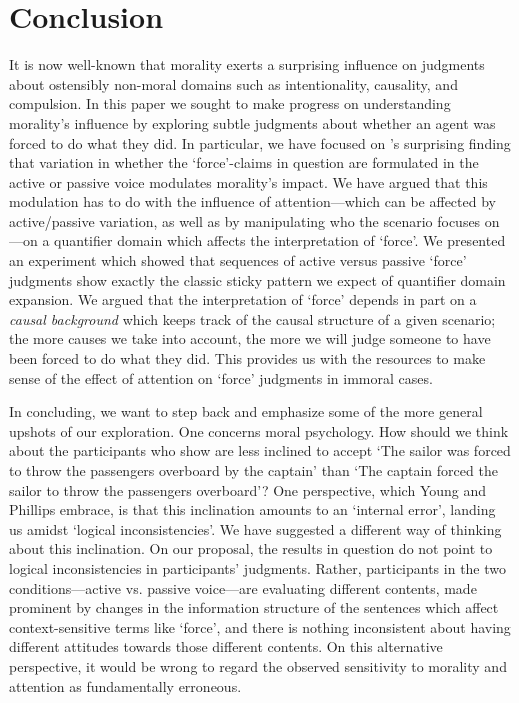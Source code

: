 \documentclass{salt}
\begin{document}
\section{Conclusion} \label{sec:conclusion}

It is now well-known that morality exerts a surprising influence on judgments about ostensibly non-moral domains such as intentionality, causality, and compulsion. In this paper we sought to make progress on understanding morality's influence by exploring subtle judgments about whether an agent was forced to do what they did. In particular, we have focused on \citet{young2011paradox}'s surprising finding that variation in whether the `force'-claims in question are formulated in the active or passive voice modulates morality's impact. We have argued that this modulation has to do with the influence of attention---which can be affected by active/passive variation, as well as by manipulating who the scenario focuses on---on a quantifier domain which affects the interpretation of `force'. We presented an experiment which showed that sequences of active versus passive `force' judgments show exactly the classic sticky pattern we expect of quantifier domain expansion. We  argued that the interpretation of `force' depends in part on a \emph{causal background} which keeps track of the causal structure of a given scenario; the more causes we take into account, the more we will judge someone to have been forced to do what they did. This provides us with the resources to make sense of the effect of  attention on `force' judgments in immoral cases.
	
In concluding, we want to step back and emphasize some of the more general upshots of our exploration. One concerns moral psychology. How should we think about the participants who show are less inclined to accept `The sailor was forced to throw the passengers overboard by the captain' than `The captain  forced the sailor to throw the passengers overboard'? One perspective, which Young and Phillips embrace, is that this inclination amounts to an `internal error', landing us amidst `logical inconsistencies'. We have suggested a different way of thinking about this inclination. On our proposal, the results in question do not point to logical inconsistencies in participants' judgments. Rather, participants in the two conditions---active vs. passive voice---are evaluating different contents, made prominent by changes in the information structure of the sentences which affect context-sensitive terms like `force', and there is nothing inconsistent about having different attitudes towards those different contents. On this alternative perspective, it would be wrong to regard the observed sensitivity to morality and attention as fundamentally erroneous. 
\end{document}
